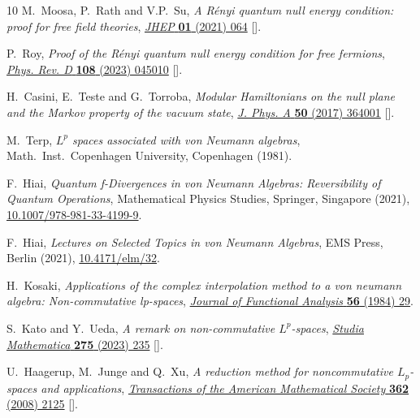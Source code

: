 \documentclass[11pt,a4paper]{article}
\theoremstyle{plain}
\numberwithin{theorem}{section}
\theoremstyle{definition}
\newcommand{\?}{\overset{?}{=}}
\begin{document}
\begin{thebibliography}{10}
M.~Moosa, P.~Rath and V.P.~Su, \emph{{A R\'enyi quantum null energy condition:
  proof for free field theories}},
  \href{https://doi.org/10.1007/JHEP01(2021)064}{\emph{JHEP} {\bfseries 01}
  (2021) 064} [\href{https://arxiv.org/abs/2007.15025}{{}}].

P.~Roy, \emph{{Proof of the R\'enyi quantum null energy condition for free
  fermions}}, \href{https://doi.org/10.1103/PhysRevD.108.045010}{\emph{Phys.
  Rev. D} {\bfseries 108} (2023) 045010}
  [\href{https://arxiv.org/abs/2212.02331}{{}}].

H.~Casini, E.~Teste and G.~Torroba, \emph{{Modular Hamiltonians on the null
  plane and the Markov property of the vacuum state}},
  \href{https://doi.org/10.1088/1751-8121/aa7eaa}{\emph{J. Phys. A} {\bfseries
  50} (2017) 364001} [\href{https://arxiv.org/abs/1703.10656}{{}}].

M.~Terp, \emph{{$L^p$} spaces associated with von Neumann algebras},
  Math.~Inst.~Copenhagen University, Copenhagen (1981).

F.~Hiai, \emph{Quantum f-Divergences in von Neumann Algebras: Reversibility of
  Quantum Operations}, Mathematical Physics Studies, Springer, Singapore
  (2021),
  \href{https://doi.org/10.1007/978-981-33-4199-9}{10.1007/978-981-33-4199-9}.

F.~Hiai, \emph{Lectures on Selected Topics in von Neumann Algebras}, EMS Press,
  Berlin (2021), \href{https://doi.org/10.4171/elm/32}{10.4171/elm/32}.

H.~Kosaki, \emph{Applications of the complex interpolation method to a von
  neumann algebra: Non-commutative lp-spaces},
  \href{https://doi.org/https://doi.org/10.1016/0022-1236(84)90025-9}{\emph{Journal
  of Functional Analysis} {\bfseries 56} (1984) 29}.

S.~Kato and Y.~Ueda, \emph{A remark on non-commutative {$L^p$}-spaces},
  \href{https://doi.org/10.4064/sm230724-11-10}{\emph{Studia Mathematica}
  {\bfseries 275} (2023) 235}
  [\href{https://arxiv.org/abs/2307.01790}{{}}].

U.~Haagerup, M.~Junge and Q.~Xu, \emph{A reduction method for noncommutative
  {$L_p$}-spaces and applications},
  \href{https://doi.org/10.1090/S0002-9947-09-04935-6}{\emph{Transactions of
  the American Mathematical Society} {\bfseries 362} (2008) 2125}
  [\href{https://arxiv.org/abs/0806.3635}{{}}].


\end{thebibliography}
\end{document}
